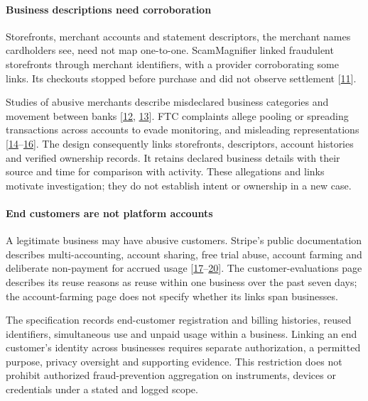 \documentclass[
  11pt,
]{article}
\begin{document}
\hypertarget{business-descriptions-need-corroboration}{%
\paragraph{Business descriptions need
corroboration}\label{business-descriptions-need-corroboration}}

Storefronts, merchant accounts and statement descriptors, the merchant
names cardholders see, need not map one-to-one. ScamMagnifier linked
fraudulent storefronts through merchant identifiers, with a provider
corroborating some links. Its checkouts stopped before purchase and did
not observe settlement {[}\protect\hyperlink{ref-Bitaab2025}{11}{]}.

Studies of abusive merchants describe misdeclared business categories
and movement between banks {[}\protect\hyperlink{ref-McCoy2012}{12},
\protect\hyperlink{ref-Tian2018}{13}{]}. FTC complaints allege pooling
or spreading transactions across accounts to evade monitoring, and
misleading representations
{[}\protect\hyperlink{ref-FTC2020FirstData}{14}--\protect\hyperlink{ref-FTC2019Allied}{16}{]}.
The design consequently links storefronts, descriptors, account
histories and verified ownership records. It retains declared business
details with their source and time for comparison with activity. These
allegations and links motivate investigation; they do not establish
intent or ownership in a new case.

\hypertarget{end-customers-are-not-platform-accounts}{%
\paragraph{End customers are not platform
accounts}\label{end-customers-are-not-platform-accounts}}

A legitimate business may have abusive customers. Stripe's public
documentation describes multi-accounting, account sharing, free trial
abuse, account farming and deliberate non-payment for accrued usage
{[}\protect\hyperlink{ref-Stripe2026CAE}{17}--\protect\hyperlink{ref-Stripe2026Farming}{20}{]}.
The customer-evaluations page describes its reuse reasons as reuse
within one business over the past seven days; the account-farming page
does not specify whether its links span businesses.

The specification records end-customer registration and billing
histories, reused identifiers, simultaneous use and unpaid usage within
a business. Linking an end customer's identity across businesses
requires separate authorization, a permitted purpose, privacy oversight
and supporting evidence. This restriction does not prohibit authorized
fraud-prevention aggregation on instruments, devices or credentials
under a stated and logged scope.
\end{document}

